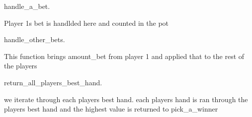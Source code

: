 \documentclass[letterpaper,10pt,english]{sphinxmanual}
\begin{document}

\begin{fulllineitems}
\label{\detokenize{PlayHoldEm:PlayHoldEm.handle_a_bet}}
\sphinxAtStartPar
handle\_a\_bet.

\sphinxAtStartPar
Player 1s bet is handlded here and counted in the pot

\end{fulllineitems}


\begin{fulllineitems}
\label{\detokenize{PlayHoldEm:PlayHoldEm.handle_other_bets}}
\sphinxAtStartPar
handle\_other\_bets.

\sphinxAtStartPar
This function brings amount\_bet from player 1 and applied that to the
rest of the players

\end{fulllineitems}


\begin{fulllineitems}
\label{\detokenize{PlayHoldEm:PlayHoldEm.main}}
\end{fulllineitems}


\begin{fulllineitems}
\label{\detokenize{PlayHoldEm:PlayHoldEm.return_all_players_best_hand}}
\sphinxAtStartPar
return\_all\_players\_best\_hand.

\sphinxAtStartPar
we iterate through each players best hand.
each players hand is ran through the players best hand
and the highest value is returned to pick\_a\_winner

\end{fulllineitems}
\end{document}
